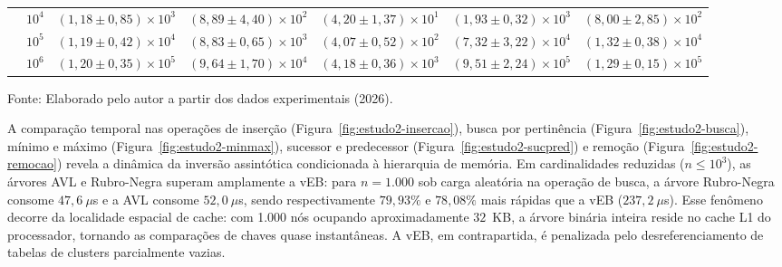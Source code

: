 \documentclass[12pt,a4paper]{report}
\begin{document}
\begin{table}[htbp]
\begin{tabular}{llccccc}
     & $10^{4}$ & $(1,18 \pm 0,85) \times 10^{3}$ & $(8,89 \pm 4,40) \times 10^{2}$ & $(4,20 \pm 1,37) \times 10^{1}$ & $(1,93 \pm 0,32) \times 10^{3}$ & $(8,00 \pm 2,85) \times 10^{2}$ \\
     & $10^{5}$ & $(1,19 \pm 0,42) \times 10^{4}$ & $(8,83 \pm 0,65) \times 10^{3}$ & $(4,07 \pm 0,52) \times 10^{2}$ & $(7,32 \pm 3,22) \times 10^{4}$ & $(1,32 \pm 0,38) \times 10^{4}$ \\
     & $10^{6}$ & $(1,20 \pm 0,35) \times 10^{5}$ & $(9,64 \pm 1,70) \times 10^{4}$ & $(4,18 \pm 0,36) \times 10^{3}$ & $(9,51 \pm 2,24) \times 10^{5}$ & $(1,29 \pm 0,15) \times 10^{5}$ \\
    \bottomrule
  \end{tabular}
  \vspace{0.2cm}
  
  \raggedright\footnotesize Fonte: Elaborado pelo autor a partir dos dados experimentais (2026).
\end{table}

A comparação temporal nas operações de inserção (Figura~\ref{fig:estudo2-insercao}), busca por pertinência (Figura~\ref{fig:estudo2-busca}), mínimo e máximo (Figura~\ref{fig:estudo2-minmax}), sucessor e predecessor (Figura~\ref{fig:estudo2-sucpred}) e remoção (Figura~\ref{fig:estudo2-remocao}) revela a dinâmica da inversão assintótica condicionada à hierarquia de memória. Em cardinalidades reduzidas ($n \le 10^3$), as árvores AVL e Rubro-Negra superam amplamente a vEB: para $n = 1.000$ sob carga aleatória na operação de busca, a árvore Rubro-Negra consome $47{,}6~\mu$s e a AVL consome $52{,}0~\mu$s, sendo respectivamente $79{,}93\%$ e $78{,}08\%$ mais rápidas que a vEB ($237{,}2~\mu$s). Esse fenômeno decorre da localidade espacial de cache: com 1.000 nós ocupando aproximadamente $32$~KB, a árvore binária inteira reside no cache L1 do processador, tornando as comparações de chaves quase instantâneas. A vEB, em contrapartida, é penalizada pelo desreferenciamento de tabelas de clusters parcialmente vazias.
\end{document}
